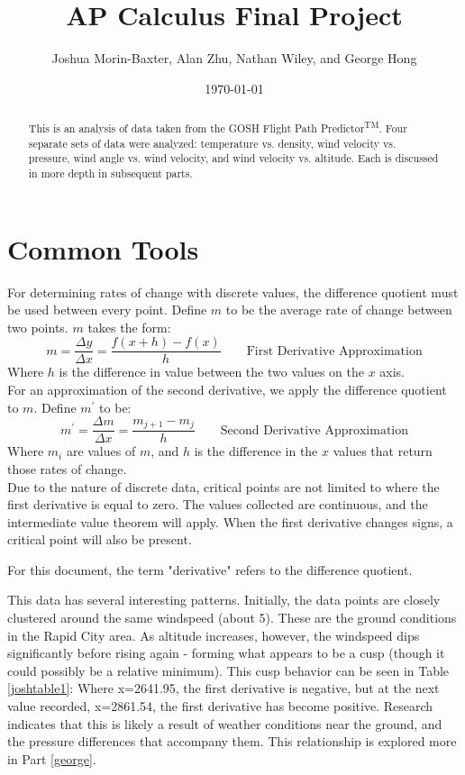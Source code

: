 \documentclass{article}
\begin{document}
\title{AP Calculus Final Project}
\author{Joshua Morin-Baxter, Alan Zhu, Nathan Wiley, and George Hong}
\date{\today}

\maketitle

\begin{abstract}
This is an analysis of data taken from the GOSH Flight Path Predictor\textsuperscript{TM}.  Four separate sets of data were analyzed: temperature vs. density, wind velocity vs. pressure, wind angle vs. wind velocity, and wind velocity vs. altitude. Each is discussed in more depth in subsequent parts.
\end{abstract}
\part{Common Tools}
For determining rates of change with discrete values, the difference quotient must be used between every point.  Define $m$ to be the average rate of change between two points.  $m$ takes the form:
$$m=\frac{\Delta y}{\Delta x}=\frac{f(x+h)-f(x)}{h}\qquad\text{First Derivative Approximation}$$
Where $h$ is the difference in value between the two values on the $x$ axis.
\\For an approximation of the second derivative, we apply the difference quotient to $m$.  Define $m^\prime$ to be:
$$m^\prime=\frac{\Delta m}{\Delta x}=\frac{m_{j+1}-m_j}{h}\qquad\text{Second Derivative Approximation}$$
Where $m_i$ are values of $m$, and $h$ is the difference in the $x$ values that return those rates of change.\\
Due to the nature of discrete data, critical points are not limited to where the first derivative is equal to zero.  The values collected are continuous, and the intermediate value theorem will apply.  When the first derivative changes signs, a critical point will also be present.
\begin{flushleft}
For this document, the term "derivative" refers to the difference quotient.
\end{flushleft}




This data has several interesting patterns.  Initially, the data points are closely clustered around the same windspeed (about 5\si{}).  These are the ground conditions in the Rapid City area.  As altitude increases, however, the windspeed dips significantly before rising again - forming what appears to be a cusp (though it could possibly be a relative minimum).  This cusp behavior can be seen in Table \ref{joshtable1}: Where x=2641.95, the first derivative is negative, but at the next value recorded, x=2861.54, the first derivative has become positive.  Research~\cite{notes} indicates that this is likely a result of weather conditions near the ground, and the pressure differences that accompany them.  This relationship is explored more in Part \ref{george}.
\end{document}
